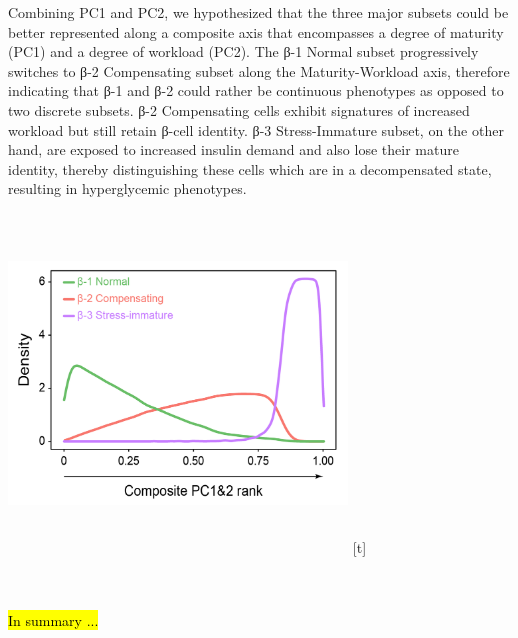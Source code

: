 


Combining PC1 and PC2, we hypothesized that the three major subsets could be better represented along a composite axis that encompasses a degree of maturity (PC1) and a degree of workload (PC2). The β-1 Normal subset progressively switches to β-2 Compensating subset along the Maturity-Workload axis, therefore indicating that β-1 and β-2 could rather be continuous phenotypes as opposed to two discrete subsets. β-2 Compensating cells exhibit signatures of increased workload but still retain β-cell identity. β-3 Stress-Immature subset, on the other hand, are exposed to increased insulin demand and also lose their mature identity, thereby distinguishing these cells which are in a decompensated state, resulting in hyperglycemic phenotypes.


{%
\includegraphics[width=9cm,height=9cm,keepaspectratio]{Chapter5/Fig/F3-6-04.png}%
}[t]%

\hl{\\\\In summary ...}

\clearpage

